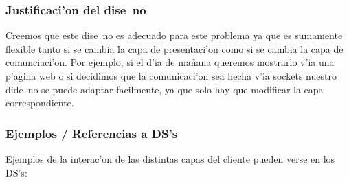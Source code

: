 \subsubsection{Justificaci'on del dise~no}
Creemos que este dise~no es adecuado para este problema ya que es sumamente flexible tanto si se cambia la capa de presentaci'on como si se cambia la capa de comunciaci'on. Por ejemplo, si el d'ia de mañana queremos mostrarlo v'ia una p'agina web o si decidimos que la comunicaci'on sea hecha v'ia sockets nuestro dide~no se puede adaptar facilmente, ya que solo hay que modificar la capa correspondiente.

\subsubsection{Ejemplos / Referencias a DS's}
Ejemplos de la interac'on de las distintas capas del cliente pueden verse en los DS's:



